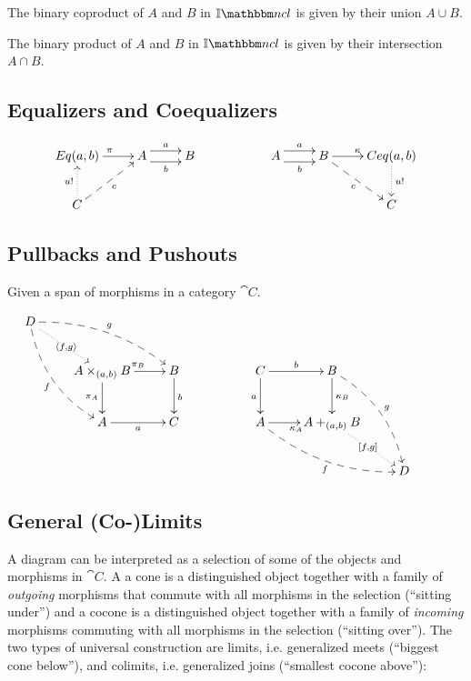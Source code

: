 \begin{myprop}
	The binary coproduct of $A$ and $B$ in $\catINCL$ is given by their union $A \cup B$.
\end{myprop}

\begin{myprop}
	The binary product of $A$ and $B$ in $\catINCL$ is given by their intersection $A \cap B$.
\end{myprop}

\subsection{Equalizers and Coequalizers}


\begin{mydef}
	\[
	\xymatrix{
		Eq(a,b) \ar[r]^{\pi} & A \ar@<1ex>[r]^{a} \ar@<-1ex>[r]_{b} & B & & A \ar@<1ex>[r]^{a} \ar@<-1ex>[r]_{b} & B \ar[r]^{\kappa} \ar@{-->}[dr]_{c} & Ceq(a,b \ar@{.>}[d]^{u!}) \\
		C \ar@{-->}[ur]_{c} \ar@{.>}[u]^{u!} & & & & & & C
	}
	\]
\end{mydef}

\subsection{Pullbacks and Pushouts}


\begin{mydef}\label{def:pullbacksAndPushout}
	Given a span of morphisms in a category $\cat{C}$.

	\[
	\xymatrix{
		D \ar@{-->}@/^1pc/[drr]^{g} \ar@{-->}@/_1pc/[ddr]_{f} \ar@{.>}[dr]|{\langle f,g\rangle} & & & & & & & \\
		& A \times_{(a,b)} B \ar[r]^{\pi_B} \ar[d]_{\pi_A}  & B \ar[d]^{b} & & C  \ar[r]^{b} \ar[d]_{a} & B \ar[d]^{\kappa_B} \ar@{-->}@/^1pc/[ddr]^{g} & \\
		& A \ar[r]_{a} & C & & A \ar@{-->}@/_1pc/[drr]_{f} \ar[r]_{\kappa_A} & A +_{(a,b)} B \ar@{.>}[dr]|{[f,g]} & \\
		& & & & & &  D
	}
	\]
	\end{mydef}

\subsection{General (Co-)Limits}

A diagram can be interpreted as a selection of some of the objects and morphisms in $\cat{C}$.
A a cone is a distinguished object together with a family of \emph{outgoing} morphisms that commute with all morphisms in the selection (``sitting under'') and a cocone is a distinguished object together with a family of \emph{incoming} morphisms commuting with all morphisms in the selection (``sitting over'').
The two types of universal construction are limits, i.e. generalized meets (``biggest cone below''), and colimits, i.e. generalized joins (``smallest cocone above''):

